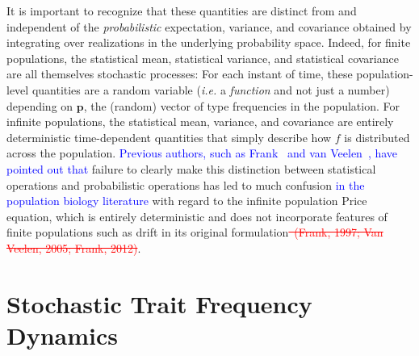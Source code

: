 It is important to recognize that these quantities are distinct from and independent of the \emph{probabilistic} expectation, variance, and covariance obtained by integrating over realizations in the underlying probability space. Indeed, for finite populations, the statistical mean, statistical variance, and statistical covariance are all themselves stochastic processes: For each instant of time, these population-level quantities are a random variable (\emph{i.e.} a \emph{function} and not just a number) depending on $\mathbf{p}$, the (random) vector of type frequencies in the population. For infinite populations, the statistical mean, variance, and covariance are entirely deterministic time-dependent quantities that simply describe how $f$ is distributed across the population. \textcolor{blue}{Previous authors, such as Frank~\citep{frank_price_1997,frank_natural_2012} and van Veelen~\citep{van_veelen_use_2005,van_veelen_problem_2020}, have pointed out that} failure to clearly make this distinction between statistical operations and probabilistic operations has led to much confusion \textcolor{blue}{in the population biology literature} with regard to the infinite population Price equation, which is entirely deterministic and does not incorporate features of finite populations such as drift in its original formulation\textcolor{red}{\st{~(Frank, 1997; Van Veelen, 2005; Frank, 2012)}}.

\section{Stochastic Trait Frequency Dynamics}\label{sec_nD_freq_eqns}

